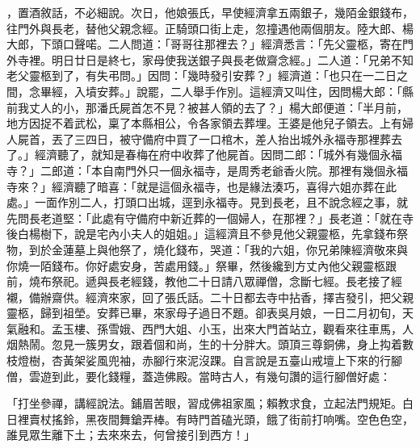 \begin{showcontents}{}
，置酒敘話，不必細說。次日，他娘張氏，早使經濟拿五兩銀子，幾陌金銀錢布，往門外與長老，替他父親念經。正騎頭口街上走，忽撞遇他兩個朋友。陸大郎、楊大郎，下頭口聲喏。二人問道：「哥哥往那裡去？」經濟悉言：「先父靈柩，寄在門外寺裡。明日廿日是終七，家母使我送銀子與長老做齋念經。」二人道：「兄弟不知老父靈柩到了，有失弔問。」因問：「幾時發引安葬？」經濟道：「也只在一二日之間，念畢經，入墳安葬。」說罷，二人舉手作別。這經濟又叫住，因問楊大郎：「縣前我丈人的小，那潘氏屍首怎不見？被甚人領的去了？」楊大郎便道：「半月前，地方因捉不着武松，稟了本縣相公，令各家領去葬埋。王婆是他兒子領去。上有婦人屍首，丟了三四日，被守備府中買了一口棺木，差人抬出城外永福寺那裡葬去了。」經濟聽了，就知是春梅在府中收葬了他屍首。因問二郎：「城外有幾個永福寺？」二郎道：「本自南門外只一個永福寺，是周秀老爺香火院。那裡有幾個永福寺來？」經濟聽了暗喜：「就是這個永福寺，也是緣法湊巧，喜得六姐亦葬在此處。」一面作別二人，打頭口出城，逕到永福寺。見到長老，且不說念經之事，就先問長老道堅：「此處有守備府中新近葬的一個婦人，在那裡？」長老道：「就在寺後白楊樹下，說是宅內小夫人的姐姐。」這經濟且不參見他父親靈柩，先拿錢布祭物，到於金蓮墓上與他祭了，燒化錢布，哭道：「我的六姐，你兄弟陳經濟敬來與你燒一陌錢布。你好處安身，苦處用錢。」祭畢，然後纔到方丈內他父親靈柩跟前，燒布祭祀。遞與長老經錢，教他二十日請八眾禪僧，念斷七經。長老接了經襯，備辦齋供。經濟來家，回了張氏話。二十日都去寺中拈香，擇吉發引，把父親靈柩，歸到祖塋。安葬已畢，來家母子過日不題。卻表吳月娘，一日二月初旬，天氣融和。孟玉樓、孫雪娥、西門大姐、小玉，出來大門首站立，觀看來往車馬，人烟熱鬧。忽見一簇男女，跟着個和尚，生的十分胖大。頭頂三尊銅佛，身上抅着數枝燈樹，杏黃架娑風兜袖，赤腳行來泥沒踝。自言說是五臺山戒壇上下來的行腳僧，雲遊到此，要化錢糧，蓋造佛殿。當時古人，有幾句讚的這行腳僧好處：

「打坐參禪，講經說法。鋪眉苦眼，習成佛祖家風；賴教求食，立起法門規矩。白日裡賣杖搖鈴，黑夜間舞鎗弄棒。有時門首磕光頭，餓了街前打响嘴。空色色空，誰見眾生離下土；去來來去，何曾接引到西方！」


\end{showcontents}
